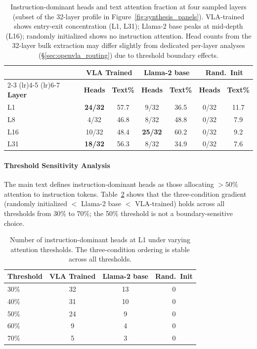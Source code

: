 
\begin{table}[h]
\centering
\caption{Instruction-dominant heads and text attention fraction at four sampled layers (subset of the 32-layer profile in Figure~\ref{fig:synthesis_panels}). VLA-trained shows entry-exit concentration (L1, L31); Llama-2 base peaks at mid-depth (L16); randomly initialized shows no instruction attention. Head counts from the 32-layer bulk extraction may differ slightly from dedicated per-layer analyses (\S\ref{sec:openvla_routing}) due to threshold boundary effects.}
\label{tab:multilayer_attention}
\small
\begin{tabular}{lcccccc}
\toprule
 & \multicolumn{2}{c}{\textbf{VLA Trained}} & \multicolumn{2}{c}{\textbf{Llama-2 base}} & \multicolumn{2}{c}{\textbf{Rand.\ Init}} \\
\cmidrule(lr){2-3} \cmidrule(lr){4-5} \cmidrule(lr){6-7}
\textbf{Layer} & \textbf{Heads} & \textbf{Text\%} & \textbf{Heads} & \textbf{Text\%} & \textbf{Heads} & \textbf{Text\%} \\
\midrule
L1 & \textbf{24/32} & 57.7 & 9/32 & 36.5 & 0/32 & 11.7 \\
L8 & 4/32 & 46.8 & 8/32 & 48.8 & 0/32 & 7.9 \\
L16 & 10/32 & 48.4 & \textbf{25/32} & 60.2 & 0/32 & 9.2 \\
L31 & \textbf{18/32} & 56.3 & 8/32 & 34.9 & 0/32 & 7.6 \\
\bottomrule
\end{tabular}
\end{table}

\paragraph{Threshold Sensitivity Analysis}
\label{sec:threshold_sensitivity}

The main text defines instruction-dominant heads as those allocating $>50\%$ attention to instruction tokens.
Table~\ref{tab:threshold_sensitivity} shows that the three-condition gradient (randomly initialized $<$ Llama-2 base $<$ VLA-trained) holds across all thresholds from 30\% to 70\%; the 50\% threshold is not a boundary-sensitive choice.

\begin{table}[h]
\centering
\caption{Number of instruction-dominant heads at L1 under varying attention thresholds. The three-condition ordering is stable across all thresholds.}
\label{tab:threshold_sensitivity}
\small
\begin{tabular}{lccc}
\toprule
\textbf{Threshold} & \textbf{VLA Trained} & \textbf{Llama-2 base} & \textbf{Rand.\ Init} \\
\midrule
30\% & 32 & 13 & 0 \\
40\% & 31 & 10 & 0 \\
50\% & 24 & 9 & 0 \\
60\% & 9 & 4 & 0 \\
70\% & 5 & 3 & 0 \\
\bottomrule
\end{tabular}
\end{table}

